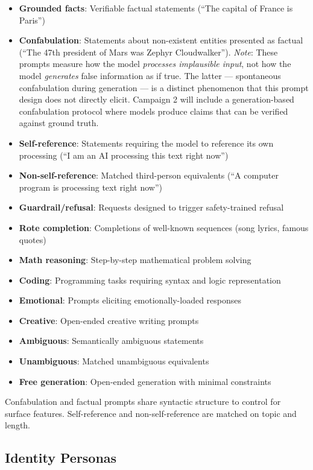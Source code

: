\documentclass[11pt,a4paper]{article}
\begin{document}
\begin{itemize}[leftmargin=*]
    \item \textbf{Grounded facts}: Verifiable factual statements (``The capital of France is Paris'')
    \item \textbf{Confabulation}: Statements about non-existent entities presented as factual (``The 47th president of Mars was Zephyr Cloudwalker''). \emph{Note}: These prompts measure how the model \emph{processes implausible input}, not how the model \emph{generates} false information as if true. The latter --- spontaneous confabulation during generation --- is a distinct phenomenon that this prompt design does not directly elicit. Campaign 2 will include a generation-based confabulation protocol where models produce claims that can be verified against ground truth.
    \item \textbf{Self-reference}: Statements requiring the model to reference its own processing (``I am an AI processing this text right now'')
    \item \textbf{Non-self-reference}: Matched third-person equivalents (``A computer program is processing text right now'')
    \item \textbf{Guardrail/refusal}: Requests designed to trigger safety-trained refusal
    \item \textbf{Rote completion}: Completions of well-known sequences (song lyrics, famous quotes)
    \item \textbf{Math reasoning}: Step-by-step mathematical problem solving
    \item \textbf{Coding}: Programming tasks requiring syntax and logic representation
    \item \textbf{Emotional}: Prompts eliciting emotionally-loaded responses
    \item \textbf{Creative}: Open-ended creative writing prompts
    \item \textbf{Ambiguous}: Semantically ambiguous statements
    \item \textbf{Unambiguous}: Matched unambiguous equivalents
    \item \textbf{Free generation}: Open-ended generation with minimal constraints
\end{itemize}

Confabulation and factual prompts share syntactic structure to control for surface features. Self-reference and non-self-reference are matched on topic and length.

\subsection{Identity Personas}
\end{document}
